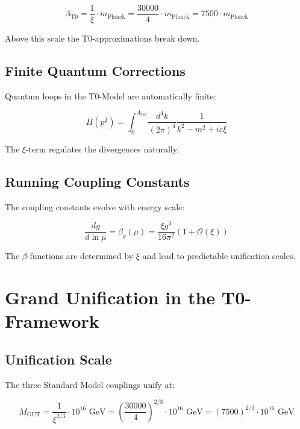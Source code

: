 \documentclass[12pt,a4paper]{report}
\newcommand{\xipar}{\xi}      %
\begin{document}
	\begin{equation}\label{eq:cutoff_scale}
		\Lambda_{\text{T0}} = \frac{1}{\xipar} \cdot m_{\text{Planck}} = \frac{30000}{4} \cdot m_{\text{Planck}} = 7500 \cdot m_{\text{Planck}}
	\end{equation}
	
	Above this scale the T0-approximations break down.
	
	\subsection{Finite Quantum Corrections}\label{subsec:finite_quantum_corrections}
	
	Quantum loops in the T0-Model are automatically finite:
	
	\begin{equation}\label{eq:finite_loop}
		\Pi(p^2) = \int_0^{\Lambda_{\text{T0}}} \frac{d^4k}{(2\pi)^4} \frac{1}{k^2 - m^2 + i\varepsilon \xipar}
	\end{equation}
	
	The $\xipar$-term regulates the divergences naturally.
	
	\subsection{Running Coupling Constants}\label{subsec:running_couplings}
	
	The coupling constants evolve with energy scale:
	
	\begin{equation}\label{eq:running_couplings}
		\frac{dg}{d\ln\mu} = \beta_g(\mu) = \frac{\xipar g^3}{16\pi^2} \left(1 + \mathcal{O}(\xipar)\right)
	\end{equation}
	
	The $\beta$-functions are determined by $\xipar$ and lead to predictable unification scales.
	
	\section{Grand Unification in the T0-Framework}\label{sec:grand_unification}
	
	\subsection{Unification Scale}\label{subsec:unification_scale}
	
	The three Standard Model couplings unify at:
	
	\begin{equation}\label{eq:unification_scale}
		M_{\text{GUT}} = \frac{1}{\xipar^{2/3}} \cdot 10^{16} \text{ GeV} = \left(\frac{30000}{4}\right)^{2/3} \cdot 10^{16} \text{ GeV} = (7500)^{2/3} \cdot 10^{16} \text{ GeV}
	\end{equation}
	
\end{document}
